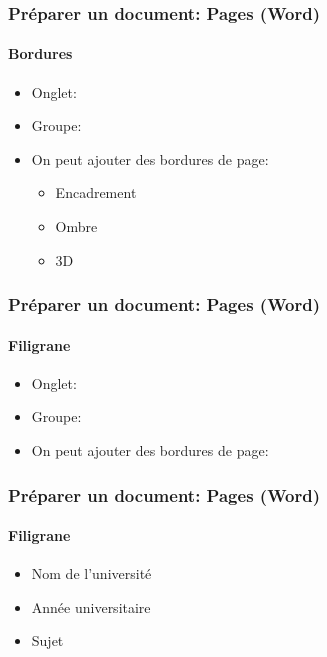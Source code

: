 \documentclass[xcolor=table]{beamer}
\begin{document}
\begin{frame}[t]
\frametitle{Préparer un document: Pages (Word)}
\framesubtitle{Bordures}

\begin{minipage}{0.49\textwidth}
	\begin{itemize}
		\item Onglet: 
		\item Groupe: 
		\item On peut ajouter des bordures de page:
		\begin{itemize}
			\item Encadrement
			\item Ombre
			\item 3D
		\end{itemize}
	\end{itemize}
\end{minipage}
\begin{minipage}{0.50\textwidth}
\end{minipage}

\end{frame}

\begin{frame}[t]
\frametitle{Préparer un document: Pages (Word)}
\framesubtitle{Filigrane}

\begin{minipage}{0.49\textwidth}
	\begin{itemize}
		\item Onglet: 
		\item Groupe: 
		\item On peut ajouter des bordures de page:
	\end{itemize}
\end{minipage}
\begin{minipage}{0.50\textwidth}
\end{minipage}

\end{frame}

\begin{frame}[t]
\frametitle{Préparer un document: Pages (Word)}
\framesubtitle{Filigrane}

\begin{minipage}{0.49\textwidth}
	\begin{itemize}
		\item Nom de l'université 
		\item Année universitaire
		\item Sujet
	\end{itemize}
\end{minipage}
\begin{minipage}{0.50\textwidth}
\end{minipage}

\end{frame}
\end{document}
